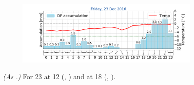 \begin{figure}[ht!]
\begin{subfigure}[b]{0.49\textwidth}
		\includegraphics[trim={4.9cm 1.cm 1.5cm 1cm},clip,
		width=\textwidth]{./fig_weathermast/T_P_U_20161223}
		\caption{} \label{fig:TPU23}
	\end{subfigure}
	\caption{\textit{(As .)} For \SI{23}{\dec} at \SI{12}{\UTC} (\protect{}, \protect{}) and at \SI{18}{\UTC} (\protect{}, \protect{}).}\label{fig:weather:23}
\end{figure}
\newpage
